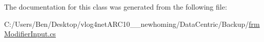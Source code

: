 The documentation for this class was generated from the following file\-:\begin{DoxyCompactItemize}
\item 
C\-:/\-Users/\-Ben/\-Desktop/vlog4net\-A\-R\-C10\-\_\-\_\-newhoming/\-Data\-Centric/\-Backup/\hyperlink{_backup_2frm_modifier_input_8cs}{frm\-Modifier\-Input.\-cs}\end{DoxyCompactItemize}
